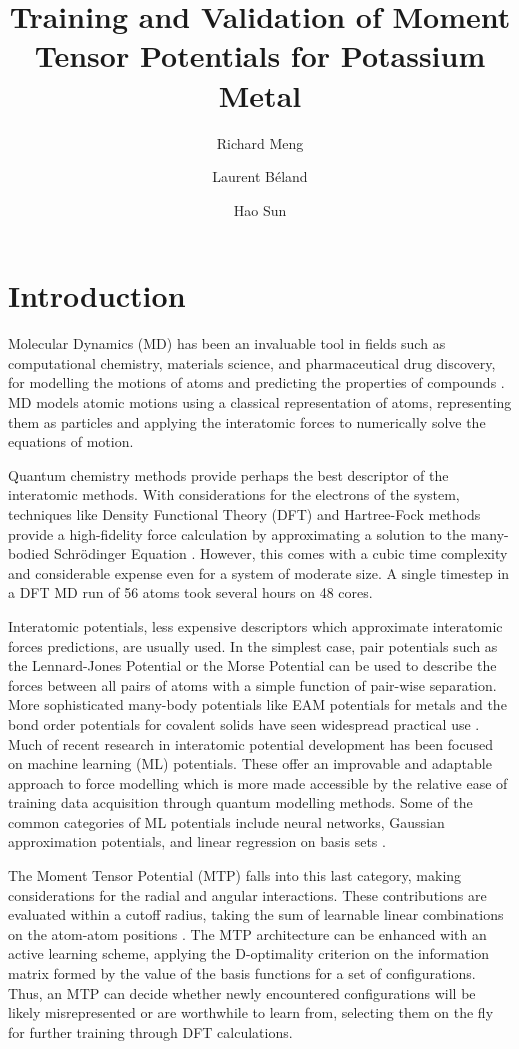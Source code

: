\documentclass[9pt,twocolumn,twoside]{opticajnl}
\title{Training and Validation of Moment Tensor Potentials for Potassium Metal}
\author[1,2,3]{ Richard Meng}
\author[1]{Laurent  Béland}
\author[1]{Hao Sun}
\affil[1]{Department of Mechanical and Materials Engineering, Queen's University, 45 Union St, Kingston, ON K7L 3N6}
\affil[2]{contact@richardzjm.com}
\affil[3]{17zjm1@queensu.ca}
\begin{document}
\maketitle

\section{Introduction}
Molecular Dynamics (MD) has been an invaluable tool in fields such as computational chemistry, materials science, and pharmaceutical drug discovery, for modelling the motions of atoms and predicting the properties of compounds \cite{karplus2002molecular}. MD models atomic motions using a classical representation of atoms, representing them as particles and applying the interatomic forces to numerically solve the equations of motion.

Quantum chemistry methods provide perhaps the best descriptor of the interatomic methods. With considerations for the electrons of the system, techniques like Density Functional Theory (DFT) and Hartree-Fock methods provide a high-fidelity force calculation by approximating a solution to the many-bodied Schrödinger Equation \cite{DFT}. However, this comes with a cubic time complexity and considerable expense even for a system of moderate size.  A single timestep in a DFT MD run of 56 atoms took several hours on 48 cores. 

Interatomic potentials, less expensive descriptors which approximate interatomic forces predictions, are usually used. In the simplest case, pair potentials such as the Lennard-Jones Potential or the Morse Potential can be used to describe the forces between all pairs of atoms with a simple function of pair-wise separation. More sophisticated many-body potentials like EAM potentials for metals and the bond order potentials for covalent solids have seen widespread practical use \cite{MatSci}. Much of recent research in interatomic potential development has been focused on machine learning (ML) potentials. These offer an improvable and adaptable approach to force modelling which is more made accessible by the relative ease of training data acquisition through quantum modelling methods. Some of the common categories of ML potentials include neural networks, Gaussian approximation potentials, and linear regression on basis sets \cite{mlip}.

The Moment Tensor Potential (MTP) falls into this last category, making considerations for the radial and angular interactions. These contributions are evaluated within a cutoff radius, taking the sum of learnable linear combinations on the atom-atom positions \cite{mtp}. The MTP architecture can be enhanced with an active learning scheme, applying the D-optimality criterion on the information matrix formed by the value of the basis functions for a set of configurations. Thus, an MTP can decide whether newly encountered configurations will be likely misrepresented or are worthwhile to learn from, selecting them on the fly for further training through DFT calculations.
\end{document}

